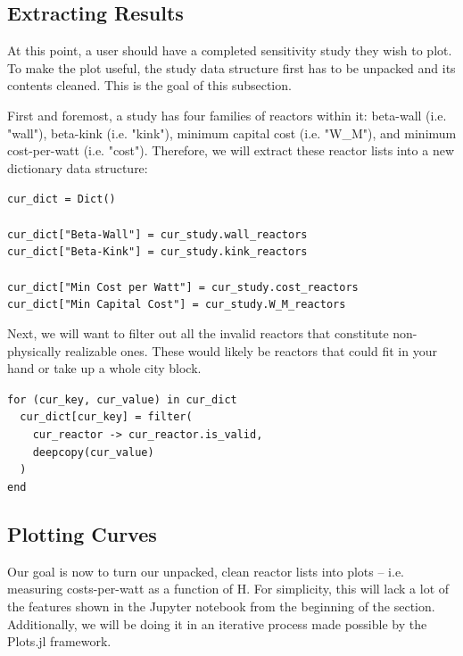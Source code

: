 \subsection{Extracting Results}

At this point, a user should have a completed sensitivity study they wish to plot. To make the plot useful, the study data structure first has to be unpacked and its contents cleaned. This is the goal of this subsection.

First and foremost, a study has four families of reactors within it: beta-wall (i.e. "wall"), beta-kink (i.e. "kink"), minimum capital cost (i.e. "W\_M"), and minimum cost-per-watt (i.e. "cost"). Therefore, we will extract these reactor lists into a new dictionary data structure:

\begin{addmargin}[1.5em]{1.5em}
\texttt{cur\_dict = Dict() \\ ~ \\
cur\_dict["Beta-Wall"] = cur\_study.wall\_reactors \\
cur\_dict["Beta-Kink"] = cur\_study.kink\_reactors \\ ~ \\
cur\_dict["Min Cost per Watt"] = cur\_study.cost\_reactors \\
cur\_dict["Min Capital Cost"] = cur\_study.W\_M\_reactors
}
\end{addmargin}

Next, we will want to filter out all the invalid reactors that constitute non-physically realizable ones. These would likely be reactors that could fit in your hand or take up a whole city block.

\begin{addmargin}[1.5em]{1.5em}
\texttt{for (cur\_key, cur\_value) in cur\_dict \\
\-\ \-\ cur\_dict[cur\_key] = filter( \\
\-\ \-\ \-\ \-\ cur\_reactor -> cur\_reactor.is\_valid, \\
\-\ \-\ \-\ \-\ deepcopy(cur\_value) \\
\-\ \-\ ) \\
end
}
\end{addmargin}

\subsection{Plotting Curves}

Our goal is now to turn our unpacked, clean reactor lists into plots -- i.e. measuring costs-per-watt as a function of H. For simplicity, this will lack a lot of the features shown in the Jupyter notebook from the beginning of the section. Additionally, we will be doing it in an iterative process made possible by the Plots.jl framework.

